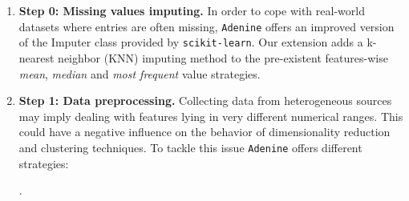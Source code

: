 \documentclass[twoside,11pt]{article}
\makeatletter
\newcommand{\ade}{\texttt{Adenine}\@\xspace}
\makeatother
\begin{document}
\begin{enumerate}[leftmargin=*]
\item[]{\bf Step 0: Missing values imputing.}
  In order to cope with real-world datasets where entries are often missing, \ade offers an improved version of the Imputer class provided by \texttt{scikit-learn}. Our extension adds a k-nearest neighbor (KNN) imputing method to the pre-existent features-wise \emph{mean}, \emph{median} and \emph{most frequent} value strategies. \citep{troyanskaya2001missing}
  

  \item[]{\bf Step 1: Data preprocessing.}
  Collecting data from heterogeneous sources may imply dealing with features lying in very different numerical ranges. This could have a negative influence on the behavior of dimensionality reduction and clustering techniques. To tackle this issue \ade offers different strategies:
  .


\end{enumerate}
\end{document}
